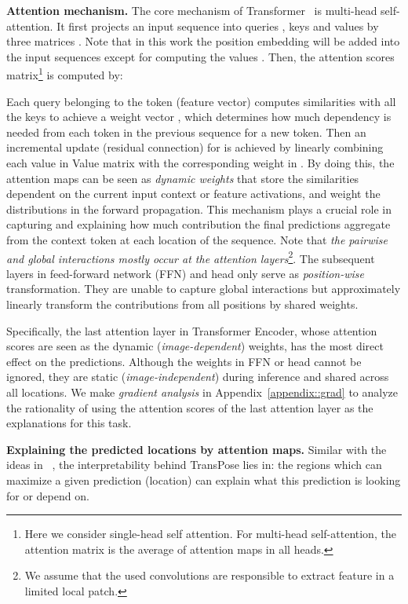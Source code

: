 \documentclass{article}
\begin{document}
\label{attention mechanism}
{\bf Attention mechanism.} The core mechanism of Transformer~\cite{vaswani2017attention} is multi-head self-attention. It first projects an input sequence  into queries , keys  and values  by three matrices . Note that in this work the position embedding will be added into the input sequences except for computing the values . Then, the attention scores matrix\footnote{Here we consider single-head self attention. For multi-head self-attention, the attention matrix is the average of attention maps in all heads.}  is computed by: 

Each query  belonging to the token (feature vector)  computes similarities with all the keys to achieve a weight vector , which determines how much dependency is needed from each token in the previous sequence for a new token. Then an incremental update (residual connection) for  is achieved by linearly combining each value in Value matrix  with the corresponding weight in . By doing this, the attention maps can be seen as \emph{dynamic weights} that store the similarities dependent on the current input context or feature activations, and weight the distributions in the forward propagation. This mechanism plays a crucial role in capturing and explaining how much contribution the final predictions aggregate from the context token at each location of the sequence. Note that \emph{the pairwise and global interactions mostly occur at the attention layers}\footnote{We assume that the used convolutions are responsible to extract feature in a limited local patch.}. The subsequent layers in feed-forward network (FFN) and head only serve as \emph{position-wise} transformation. They are unable to capture global interactions but approximately linearly transform the contributions from all positions by shared weights. 

Specifically, the last attention layer in Transformer Encoder, whose attention scores are seen as the dynamic (\emph{image-dependent}) weights, has the most direct effect on the predictions. Although the weights in FFN or head cannot be ignored, they are static (\emph{image-independent}) during inference and shared across all locations. We make \emph{gradient analysis} in Appendix~\ref{appendix::grad} to analyze the rationality of using the attention scores of the last attention layer as the explanations for this task. 

\label{paper::grad}
{\bf Explaining the predicted locations by attention maps. } Similar with the ideas in ~\cite{erhan2009visualizing,simonyan2013deep}, the interpretability behind TransPose lies in: the regions which can maximize a given prediction (location) can explain what this prediction is looking for or depend on. 
\end{document}
